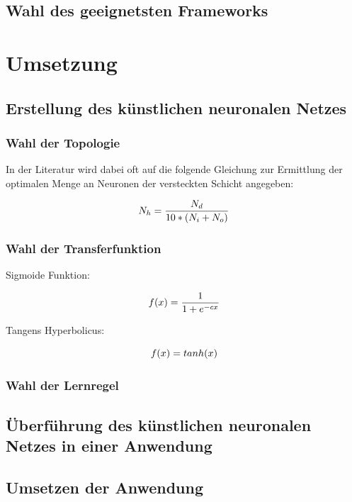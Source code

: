 \documentclass[a4paper,DIV11,bibliography=totoc,headings=normal,ngerman,headsepline,listof=totoc,parskip=half]{scrreprt}
\newcommand*{\formelentry}[1]{\addcontentsline{for}{formel}{\protect\numberline{Formel~\theequation} #1}}
\begin{document}
\section{Wahl des geeignetsten Frameworks} %
\chapter{Umsetzung} %
\section{Erstellung des künstlichen neuronalen Netzes} %

\subsection{Wahl der Topologie} %
In der Literatur wird dabei oft auf die folgende Gleichung zur Ermittlung der optimalen  Menge an Neuronen der versteckten Schicht angegeben:

\begin{equation}\formelentry{Optimale Anzahl Neuronen in der versteckten Schicht}
  N_h = \frac{N_d}{10*(N_i+N_o)}
\end{equation}

\subsection{Wahl der Transferfunktion} %

Sigmoide Funktion:

\begin{equation}\formelentry{Sigmoide Funktion}
f(x)= \frac{1}{1+e^{-cx}}
\end{equation}

Tangens Hyperbolicus:

\begin{equation}\formelentry{Tanh Funktion}
f(x)= tanh(x)
\end{equation}

\subsection{Wahl der Lernregel} %
\section{Überführung des künstlichen neuronalen Netzes in einer Anwendung}
\section{Umsetzen der Anwendung} %
\end{document}
